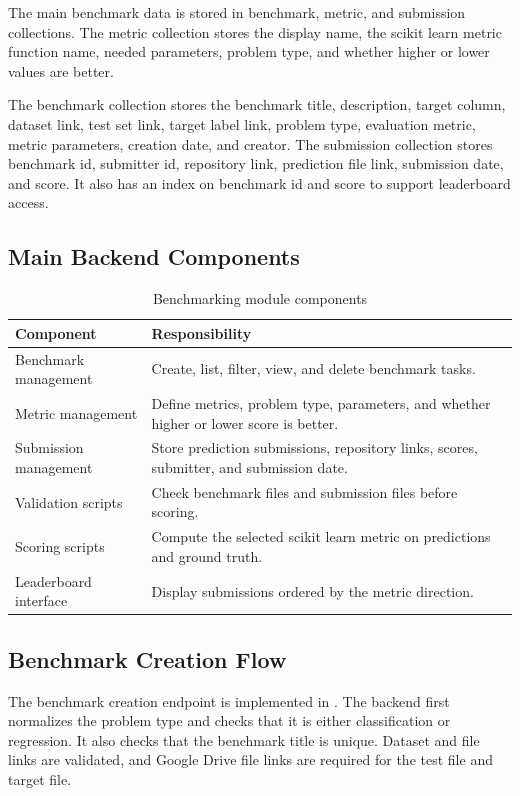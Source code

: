 \documentclass[12pt,a4paper,oneside]{report}
\DeclareRobustCommand{\modulepath}[1]{\path{#1}}
\begin{document}
The main benchmark data is stored in benchmark, metric, and submission
collections. The metric collection stores the display name, the scikit learn
metric function name, needed parameters, problem type, and whether higher or
lower values are better.

\noindent The benchmark collection stores the benchmark title, description, target
column, dataset link, test set link, target label link, problem type,
evaluation metric, metric parameters, creation date, and creator. The
submission collection stores benchmark id, submitter id, repository link,
prediction file link, submission date, and score. It also has an index on
benchmark id and score to support leaderboard access.

\subsection{Main Backend Components}

\begin{table}[!htbp]
\centering
\caption{Benchmarking module components}
\label{tab:benchmark components}
\begin{tabular}{p{}p{}}
\toprule
Component & Responsibility \\
\midrule
Benchmark management & Create, list, filter, view, and delete benchmark
tasks. \\
Metric management & Define metrics, problem type, parameters, and whether
higher or lower score is better. \\
Submission management & Store prediction submissions, repository links,
scores, submitter, and submission date. \\
Validation scripts & Check benchmark files and submission files before
scoring. \\
Scoring scripts & Compute the selected scikit learn metric on predictions and
ground truth. \\
Leaderboard interface & Display submissions ordered by the metric direction. \\
\bottomrule
\end{tabular}
\end{table}

\subsection{Benchmark Creation Flow}

The benchmark creation endpoint is implemented in
\modulepath{routes/benchmark.js}. The backend first normalizes the problem type
and checks that it is either classification or regression. It also checks that
the benchmark title is unique. Dataset and file links are validated, and Google
Drive file links are required for the test file and target file.
\end{document}
